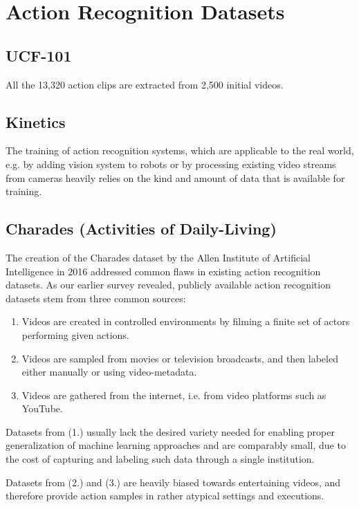 \section{Action Recognition Datasets}
\label{sec:datasets}

\subsection{UCF-101}

All the 13,320 action clips are extracted from 2,500 initial videos.


\subsection{Kinetics}

The training of action recognition systems, which are applicable to the real world, e.g. by adding vision system to robots or by processing existing video streams from cameras heavily relies on the kind and amount of data that is available for training.


\subsection{Charades (Activities of Daily-Living)}

The creation of the Charades dataset \cite{sigurdsson_hollywood_2016} by the Allen Institute of Artificial Intelligence in 2016 addressed common flaws in existing action recognition datasets.
As our earlier survey revealed, publicly available action recognition datasets stem from three common sources:
\begin{enumerate}
    \item Videos are created in controlled environments by filming a finite set of actors performing given actions.
    \item Videos are sampled from movies or television broadcasts, and then labeled either manually or using video-metadata.
    \item Videos are gathered from the internet, i.e. from video platforms such as YouTube.
\end{enumerate}

Datasets from (1.) usually lack the desired variety needed for enabling proper generalization of machine learning approaches and are comparably small, due to the cost of capturing and labeling such data through a single institution.

Datasets from (2.) and (3.) are heavily biased towards entertaining videos, and therefore provide action samples in rather atypical settings and executions.

